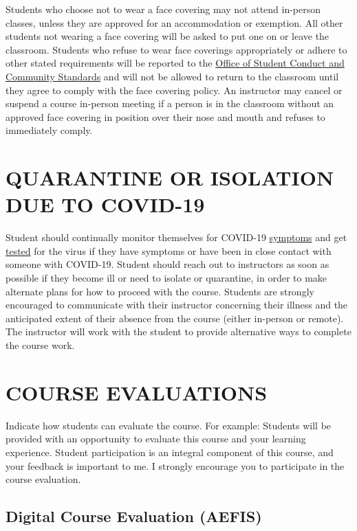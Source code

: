 \documentclass[11pt,man]{article}
\begin{document}
Students who choose not to wear a face covering may not attend in-person
classes, unless they are approved for an accommodation or exemption. All
other students not wearing a face covering will be asked to put one on
or leave the classroom. Students who refuse to wear face coverings
appropriately or adhere to other stated requirements will be reported to
the \href{https://conduct.students.wisc.edu/}{Office of Student Conduct
and Community Standards} and will not be allowed to return to the
classroom until they agree to comply with the face covering policy. An
instructor may cancel or suspend a course in-person meeting if a person
is in the classroom without an approved face covering in position over
their nose and mouth and refuses to immediately comply.

\hypertarget{quarantine-or-isolation-due-to-covid-19}{%
\section{QUARANTINE OR ISOLATION DUE TO
COVID-19}\label{quarantine-or-isolation-due-to-covid-19}}

Student should continually monitor themselves for COVID-19
\href{https://healthscreen.wisc.edu/}{symptoms} and get
\href{https://www.uhs.wisc.edu/medical/testing/}{tested} for the virus
if they have symptoms or have been in close contact with someone with
COVID-19. Student should reach out to instructors as soon as possible if
they become ill or need to isolate or quarantine, in order to make
alternate plans for how to proceed with the course. Students are
strongly encouraged to communicate with their instructor concerning
their illness and the anticipated extent of their absence from the
course (either in-person or remote). The instructor will work with the
student to provide alternative ways to complete the course work.

\hypertarget{course-evaluations}{%
\section{COURSE EVALUATIONS}\label{course-evaluations}}

Indicate how students can evaluate the course. For example: Students
will be provided with an opportunity to evaluate this course and your
learning experience. Student participation is an integral component of
this course, and your feedback is important to me. I strongly encourage
you to participate in the course evaluation.

\hypertarget{digital-course-evaluation-aefis}{%
\subsection{Digital Course Evaluation
(AEFIS)}\label{digital-course-evaluation-aefis}}
\end{document}
